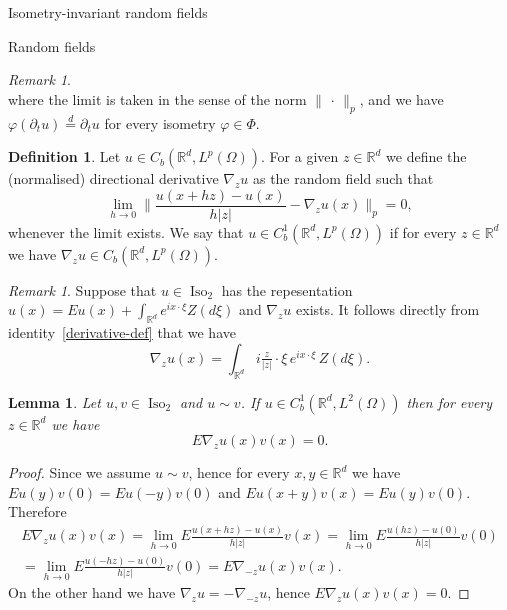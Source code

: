 \documentclass[a4paper,10pt,fleqn]{amsart}
\newtheorem{lemma}[theorem]{Lemma}
\theoremstyle{remark}
\newtheorem{remark}[theorem]{Remark}
\theoremstyle{definition}
\newtheorem{definition}[theorem]{Definition}
\DeclareMathOperator{\Iso}{Iso}
\newcommand{\dt} {\partial_t}
\newcommand{\grad} {\nabla_{\!z}}
\newcommand{\X} {{\mathbb{R}^d}}
\renewcommand{\phi} {\varphi}
\renewcommand{\=} {\overset{d}{=}}
\newcommand{\Lp} {{L^p(\Omega)}}
\newcommand{\Ld} {{L^2(\Omega)}}
\begin{document}
\begin{section}{Isometry-invariant random fields}
\begin{subsection}{Random fields}
\begin{remark}
\begin{equation}
    \end{equation}
    where the limit is taken in the sense of the norm $\|\,\cdot\,\|_p$, and we have
    $\phi (\dt u) \= \dt u$ for every isometry $\phi\in\Phi$.
  \end{remark}
  \begin{definition}
   Let $u\in C_b(\X,\Lp)$. For a given $z\in\X$ we define the (normalised) directional derivative $\grad u$ as the random field such that
   \begin{equation}\label{derivative-def}
    \lim_{h\to0}\Big\|\frac{u(x+hz)-u(x)}{h|z|}-\grad u(x)\Big\|_p = 0, 
   \end{equation}
   whenever the limit exists.
   We say that $u\in C^1_b(\X,\Lp)$ if for every $z\in\X$ we have $\nabla_z u\in C_b(\X,\Lp)$.
  \end{definition}
  \begin{remark}\label{spectral-derivative}
Suppose that $u\in\Iso_2$ has the repesentation
$u(x)=Eu(x)+\int_\X e^{ix\cdot\xi}Z(d\xi)$ and $\grad u$ exists. It follows directly from identity~\eqref{derivative-def} that
 we have
\begin{equation*}
  \grad u(x) = \int_\X i\tfrac{z}{|z|}\cdot\xi\,e^{ix\cdot\xi}\,Z(d\xi).
\end{equation*}
\end{remark}
  \begin{lemma}\label{derivative-zero}
Let $u,v\in\Iso_2$ and $u\sim v$. If $u\in C^1_b(\X,\Ld)$ then for every $z\in\X$ we have
\begin{equation*}
E\grad u(x)v(x) = 0. 
\end{equation*}
\end{lemma}
\begin{proof}
Since we assume $u\sim v$, hence for every $x,y\in\X$ we have $Eu(y)v(0) = Eu(-y)v(0)$
and $Eu(x+y)v(x)=Eu(y)v(0)$.
Therefore
 \begin{multline*}
   E\grad u(x)v(x)
   = \lim_{h\to0} E \frac{u(x+hz)-u(x)}{h|z|}v(x)
   = \lim_{h\to0} E \frac{u(hz)-u(0)}{h|z|}v(0) \\
   = \lim_{h\to0} E \frac{u(-hz)-u(0)}{h|z|}v(0) = E\nabla_{-z}
    u(x)v(x).
 \end{multline*}
 On the other hand we have $\grad u  =-\nabla_{-z}u$, hence $E\grad u(x)v(x)=0$.
\end{proof}


\end{subsection}
\end{section}
\end{document}
